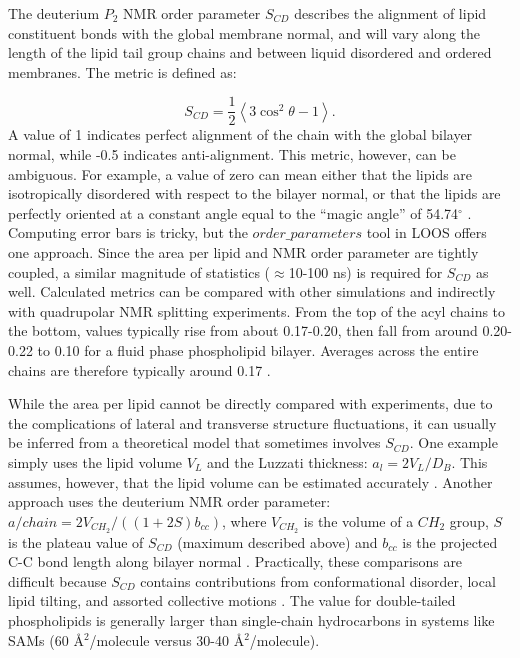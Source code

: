 \documentclass[9pt,bestpractices]{livecoms}
\begin{document}
The deuterium $P_2$ NMR order parameter $S_{CD}$ describes the alignment of lipid constituent bonds with the global membrane normal, and will vary along the length of the lipid tail group chains and between liquid disordered and ordered membranes.
The metric is defined as:

\begin{equation}\label{eq:6}
	S_{CD}=\frac{1}{2} \left<3\cos^2\theta-1 \right>.
\end{equation}
A value of 1 indicates perfect alignment of the chain with the global bilayer normal, while -0.5 indicates anti-alignment.
This metric, however, can be ambiguous.
For example, a value of zero can mean either that the lipids are isotropically disordered with respect to the bilayer normal, or that the lipids are perfectly oriented at a constant angle equal to the ``magic angle'' of 54.74$^{\circ}$ \cite{Poger2016}.
Computing error bars is tricky, but the $order\_parameters$ tool in LOOS offers one approach.
Since the area per lipid and NMR order parameter are tightly coupled, a similar magnitude of statistics ($\approx$10-100 ns) is required for $S_{CD}$ as well.
Calculated metrics can be compared with other simulations and indirectly with quadrupolar NMR splitting experiments.
From the top of the acyl chains to the bottom, values typically rise from about 0.17-0.20, then fall from around 0.20-0.22 to 0.10 for a fluid phase phospholipid bilayer.
Averages across the entire chains are therefore typically around 0.17 \cite{Venable2015}.

While the area per lipid cannot be directly compared with experiments, due to the complications of lateral and transverse structure fluctuations, it can usually be inferred from a theoretical model that sometimes involves $S_{CD}$.
One example simply uses the lipid volume $V_L$ and the Luzzati thickness: $a_l=2V_L/D_B$.
This assumes, however, that the lipid volume can be estimated accurately \cite{Poger2016}.
Another approach uses the deuterium NMR order parameter: $a/chain=2V_{CH_2}/((1+2S)b_{cc})$, where $V_{CH_2}$ is the volume of a $CH_2$ group, $S$ is the plateau value of $S_{CD}$ (maximum described above) and $b_{cc}$ is the projected C-C bond length along bilayer normal \cite{Nagle1993}.
Practically, these comparisons are difficult because $S_{CD}$ contains contributions from conformational disorder, local lipid tilting, and assorted collective motions \cite{Venable2015}.
The value for double-tailed phospholipids is generally larger than single-chain hydrocarbons in systems like SAMs (60 \AA$^2$/molecule versus 30-40 \AA$^2$/molecule).
\end{document}

